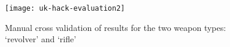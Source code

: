 \begin{figure}[h]
	\texttt{[image: uk-hack-evaluation2]}
	\caption{Manual cross validation of results for the two weapon types: `revolver' and `rifle'}
	\label{fig:uk-hack-eval}
\end{figure}

